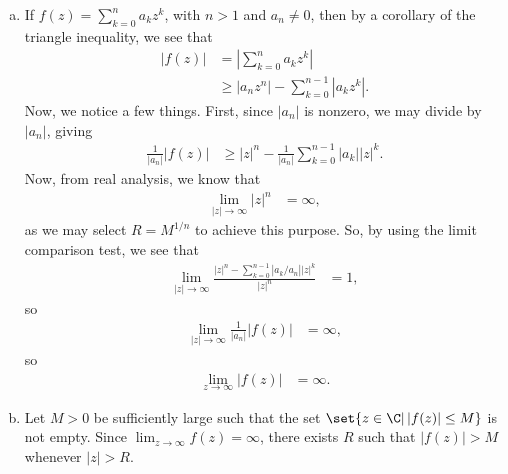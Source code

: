 \documentclass[10pt]{mypackage}
\begin{document}
\begin{solution}\hfill
  \begin{enumerate}[(a)]
    \item If $f(z) = \sum_{k=0}^{n} a_kz^{k}$, with $n > 1$ and $a_n \neq 0$, then by a corollary of the triangle inequality, we see that
      \begin{align*}
        \left\vert f(z) \right\vert &= \left\vert \sum_{k=0}^{n}a_kz^{k} \right\vert\\
                                    &\geq \left\vert a_nz^{n} \right\vert - \sum_{k=0}^{n-1}\left\vert a_kz^{k} \right\vert.
      \end{align*}
      Now, we notice a few things. First, since $\left\vert a_n \right\vert$ is nonzero, we may divide by $\left\vert a_n \right\vert$, giving
      \begin{align*}
        \frac{1}{\left\vert a_n \right\vert} \left\vert f(z) \right\vert &\geq \left\vert z \right\vert^{n} - \frac{1}{\left\vert a_n \right\vert} \sum_{k=0}^{n-1} \left\vert a_k \right\vert \left\vert z \right\vert^{k}.
      \end{align*}
      Now, from real analysis, we know that
      \begin{align*}
        \lim_{|z|\rightarrow\infty} |z|^{n} &= \infty,
      \end{align*}
      as we may select $R = M^{1/n}$ to achieve this purpose. So, by using the limit comparison test, we see that
      \begin{align*}
        \lim_{|z|\rightarrow\infty} \frac{\left\vert z \right\vert^{n} - \sum_{k=0}^{n-1} \left\vert a_k/a_n \right\vert \left\vert z \right\vert^{k}}{\left\vert z \right\vert^{n}} &= 1,
      \end{align*}
      so
      \begin{align*}
        \lim_{\left\vert z \right\vert\rightarrow\infty} \frac{1}{\left\vert a_n \right\vert} \left\vert f(z) \right\vert &= \infty,
      \end{align*}
      so
      \begin{align*}
        \lim_{z\rightarrow\infty} \left\vert f(z) \right\vert &= \infty.
      \end{align*}
    \item Let $M > 0$ be sufficiently large such that the set $\set{z\in \C | \left\vert f(z) \right\vert \leq M}$ is not empty. Since $\lim_{z\rightarrow\infty} f(z) = \infty$, there exists $R$ such that $\left\vert f(z) \right\vert > M$ whenever $\left\vert z \right\vert > R$.\newline


\end{enumerate}
\end{solution}
\end{document}

